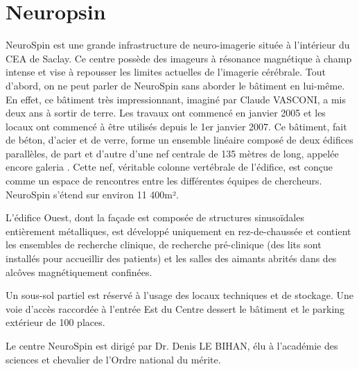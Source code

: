 \section{Neuropsin}

NeuroSpin est une grande infrastructure de neuro-imagerie située à l’intérieur du CEA de Saclay. Ce centre possède des imageurs à résonance magnétique à champ intense et vise à repousser les limites actuelles de l’imagerie cérébrale. Tout d’abord, on ne peut parler de NeuroSpin sans aborder le bâtiment en lui-même. En effet, ce bâtiment très impressionnant, imaginé par Claude VASCONI, a mis deux ans à sortir de terre. Les travaux ont commencé en janvier 2005 et les locaux ont commencé à être utilisés depuis le 1er janvier 2007. Ce bâtiment, fait de béton, d’acier et de verre, forme un ensemble linéaire composé de deux édifices parallèles, de part et d’autre d’une nef centrale de 135 mètres de long, appelée encore \og{} galeria \fg{}. Cette nef, véritable colonne vertébrale de l’édifice, est conçue comme un espace de rencontres entre les différentes équipes de chercheurs. NeuroSpin s’étend sur environ 11 400m².

L’édifice Ouest, dont la façade est composée de structures sinusoïdales entièrement métalliques, est développé uniquement en rez-de-chaussée et contient les ensembles de recherche clinique, de recherche pré-clinique (des lits sont installés pour accueillir des patients) et les salles des aimants abrités dans des alcôves magnétiquement confinées.

Un sous-sol partiel est réservé à l’usage des locaux techniques et de stockage.
Une voie d’accès raccordée à l’entrée Est du Centre dessert le bâtiment et le parking extérieur de 100 places.

Le centre NeuroSpin est dirigé par Dr. Denis LE BIHAN, élu à l'académie des sciences et chevalier de l'Ordre national du mérite.

